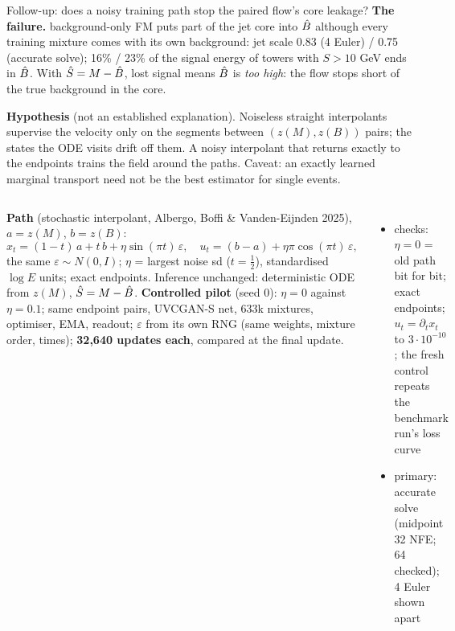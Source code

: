 
\begin{frame}{Follow-up: does a noisy training path stop the paired flow's core leakage?}
\small
\textbf{The failure.} \pai{} background-only FM puts part of the jet core into $\hat B$ although every
training mixture comes with its own background: jet scale 0.83 (4 Euler) / 0.75 (accurate solve);
16\% / 23\% of the signal energy of towers with $S > 10$ GeV ends in $\hat B$. With $\hat S = M - \hat B$, lost
signal means $\hat B$ is \emph{too high}: the flow stops short of the true background in the core.

\vspace{0.3em}
\textbf{Hypothesis} (not an established explanation). Noiseless straight interpolants supervise the
velocity only on the segments between $(z(M), z(B))$ pairs; the states the ODE visits drift off them.
A noisy interpolant that returns exactly to the endpoints trains the field around the paths. Caveat: an
exactly learned marginal transport need not be the best estimator for single events.

\vspace{0.2em}
\begin{columns}[T]
\footnotesize
\textbf{Path} (stochastic interpolant, Albergo, Boffi \& Vanden-Eijnden 2025), $a = z(M)$, $b = z(B)$:
\[ x_t = (1-t)\,a + t\,b + \eta \sin(\pi t)\,\varepsilon, \quad u_t = (b - a) + \eta\pi\cos(\pi t)\,\varepsilon, \]
the same $\varepsilon \sim N(0, I)$; $\eta$ = largest noise sd ($t = \tfrac12$), standardised $\log E$ units;
exact endpoints. Inference unchanged: deterministic ODE from $z(M)$, $\hat S = M - \hat B$.
\footnotesize
\textbf{Controlled pilot} (seed 0): $\eta = 0$ against $\eta = 0.1$; same endpoint pairs, UVCGAN-S net,
633k mixtures, optimiser, EMA, readout; $\varepsilon$ from its own RNG (same weights, mixture order,
times); \textbf{32{,}640 updates each}, compared at the final update.
\begin{itemize}\setlength\itemsep{0.02em}
\item checks: $\eta = 0$ = old path bit for bit; exact endpoints; $u_t = \partial_t x_t$ to $3\cdot10^{-10}$;
  the fresh control repeats the benchmark run's loss curve
\item primary: accurate solve (midpoint 32 NFE; 64 checked); 4 Euler shown apart
\end{itemize}
\end{columns}
\end{frame}

